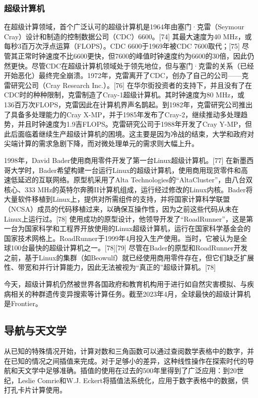 \subsubsection{超级计算机}  
在超级计算领域，首个广泛认可的超级计算机是1964年由塞门·克雷（Seymour Cray）设计和制造的控制数据公司（CDC）6600。[74] 其最大速度为40 MHz，或每秒3百万次浮点运算（FLOPS）。CDC 6600于1969年被CDC 7600取代；[75] 尽管其正常时钟速度不比6600更快，但7600的峰值时钟速度约为6600的30倍，因此仍然更快。尽管CDC在超级计算机领域处于领先地位，但与塞门·克雷的关系（已经开始恶化）最终完全崩溃。1972年，克雷离开了CDC，创办了自己的公司——克雷研究公司（Cray Research Inc.）。[76] 在华尔街投资者的支持下，并且没有了在CDC时的种种限制，克雷制造了Cray-1超级计算机。其时钟速度为80 MHz，或136百万次FLOPS，克雷因此在计算机界声名鹊起。到1982年，克雷研究公司推出了具备多处理能力的Cray X-MP，并于1985年发布了Cray-2，继续推动多处理趋势，并且时钟速度为1.9吉FLOPS。克雷研究公司于1988年开发了Cray Y-MP，但此后面临着继续生产超级计算机的困境。这主要是因为冷战的结束，大学和政府对尖端计算的需求急剧下降，而对微处理单元的需求则大幅上升。

1998年，David Bader使用商用零件开发了第一台Linux超级计算机。[77] 在新墨西哥大学时，Bader希望构建一台运行Linux的超级计算机，使用商用现货零件和高速低延迟的互联网络。原型机采用了Alta Technologies的“AltaCluster”，由八台双核心、333 MHz的英特尔奔腾II计算机组成，运行经过修改的Linux内核。Bader将大量软件移植到Linux上，提供对所需组件的支持，并将国家计算科学联盟（NCSA）成员的代码移植过来，以确保互操作性，因为之前这些代码从未在Linux上运行过。[78] 使用成功的原型设计，他领导开发了“RoadRunner”，这是第一台为国家科学和工程界开放使用的Linux超级计算机，运行在国家科学基金会的国家技术网格上。RoadRunner于1999年4月投入生产使用。当时，它被认为是全球100台最快的超级计算机之一。[78][79] 尽管在Bader的原型和RoadRunner开发之前，基于Linux的集群（如Beowulf）就已经使用商用零件存在，但它们缺乏扩展性、带宽和并行计算能力，因此无法被视为“真正的”超级计算机。[78]

今天，超级计算机仍然被世界各国政府和教育机构用于进行如自然灾害模拟、与疾病相关的种群遗传变异搜索等计算任务。截至2023年4月，全球最快的超级计算机是Frontier。
\subsection{导航与天文学}  
从已知的特殊情况开始，计算对数和三角函数可以通过查阅数学表格中的数字，并在已知的情况之间插值来完成。对于足够小的差异，这种线性操作在探索时代的导航和天文学中足够准确。插值的使用在过去的500年里得到了广泛应用：到20世纪，Leslie Comrie和W.J. Eckert将插值法系统化，应用于数字表格中的数据，供打孔卡片计算使用。
